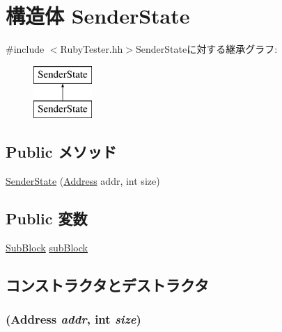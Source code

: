 \hypertarget{structRubyTester_1_1SenderState}{
\section{構造体 SenderState}
\label{structRubyTester_1_1SenderState}
}


{\ttfamily \#include $<$RubyTester.hh$>$}SenderStateに対する継承グラフ:\begin{figure}[H]
\begin{center}
\leavevmode
\includegraphics[height=2cm]{structRubyTester_1_1SenderState}
\end{center}
\end{figure}
\subsection*{Public メソッド}
\begin{DoxyCompactItemize}
\item 
\hyperlink{structRubyTester_1_1SenderState_ab3824d600733ee8d05070ea25d61028d}{SenderState} (\hyperlink{classAddress}{Address} addr, int size)
\end{DoxyCompactItemize}
\subsection*{Public 変数}
\begin{DoxyCompactItemize}
\item 
\hyperlink{classSubBlock}{SubBlock} \hyperlink{structRubyTester_1_1SenderState_a81bfae9b069d61b34b007fa18c34a8d1}{subBlock}
\end{DoxyCompactItemize}


\subsection{コンストラクタとデストラクタ}
\hypertarget{structRubyTester_1_1SenderState_ab3824d600733ee8d05070ea25d61028d}{
\subsubsection[{SenderState}]{ ({\bf Address} {\em addr}, \/  int {\em size})}}
\label{structRubyTester_1_1SenderState_ab3824d600733ee8d05070ea25d61028d}



